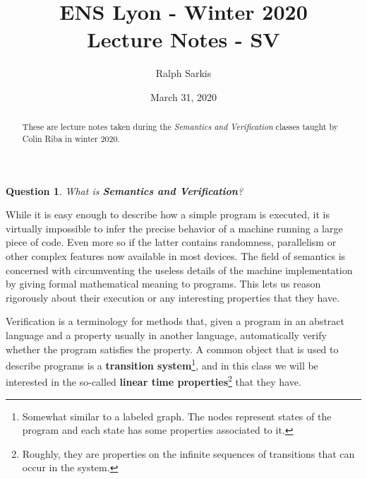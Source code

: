 \documentclass{tufte-handout} %
\title{	
	\normalfont\normalsize 
	{ENS Lyon - Winter 2020} \\ [0pt] %
	\huge Lecture Notes - SV%
}\author{Ralph Sarkis} %
\date{\vspace{-5pt}\normalsize March 31, 2020} %
\newtheorem{quest}[thm]{Question}
\theoremstyle{definition}
\theoremstyle{remark}
\newcommand{\0}{\textsf{0}}
\newcommand{\1}{\textsf{1}}
\newcommand{\AP}{\text{AP}}
\begin{document}
\justifying 
\maketitle
\begin{abstract}
	These are lecture notes taken during the \textit{Semantics and Verification} classes taught by Colin Riba in winter 2020.
\end{abstract}
\tableofcontents
\begin{quest}
	What is \textbf{Semantics and Verification}?
\end{quest}
While it is easy enough to describe how a simple program is executed, it is virtually impossible to infer the precise behavior of a machine running a large piece of code. Even more so if the latter contains randomness, parallelism or other complex features now available in most devices. The field of semantics is concerned with circumventing the useless details of the machine implementation by giving formal mathematical meaning to programs. This lets us reason rigorously about their execution or any interesting properties that they have.

Verification is a terminology for methods that, given a program in an abstract language and a property usually in another language, automatically verify whether the program satisfies the property. A common object that is used to describe programs is a \textbf{transition system}\footnote{Somewhat similar to a labeled graph. The nodes represent states of the program and each state has some properties associated to it. }, and in this class we will be interested in the so-called \textbf{linear time properties}\footnote{Roughly, they are properties on the infinite sequences of transitions that can occur in the system.} that they have.

\end{document}
